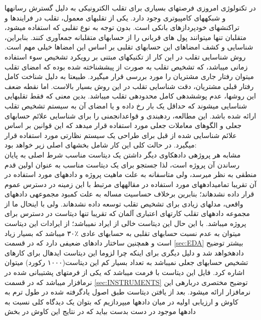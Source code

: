 \documentclass[journal]{IEEEtran}
\newcommand{\نیمفاصله}{\halfspace}
\renewcommand{\ }{\halfspace}
\newcommand{\وکا}{\lr{WEKA} }
\newcommand{\ار}{\lr{R} }
\renewcommand{\|}[1][.3em]{\hspace{#1}|\hspace{#1}}
\renewcommand{\,}[1][.3em]{,\hspace{#1}}
\begin{document}
در تکنولوژی امروزی فرصت\ های بسیاری برای تقلب الکترونیکی به دلیل گسترش رسانه\ ها و شبکه\ های کامپیوتری وجود دارد. یکی از تقلب\ های معمول، تقلب در فرایند\ ها و تراکنش\ های خودپردازهای بانکی است. بدون توجه به نوع تقلبی که استفاده می\ شود، متقلبان تنها می\ توانند پول های قربانی را از حساب\ های متقلبانه جمع\ آوری کنند. بنابراین، شناسایی و کشف امضاهای این حساب\ های تقلبی بر اساس این
امضاها خیلی مهم است.
روش شناسایی تقلب در این کار از تکنیک\ های مبتنی بر رویکرد تشخیص سوء استفاده زمانی می\ باشد، که تشخیص تقلب به صورت از پیش\ شناخته شده بوده که امضای تقلب می\ توان رفتار جاری مشتریان را مورد بررسی قرار می\ گیرد. طبیعتا به دلیل شناخت کامل رفتار قبلی مشتریان، دقت شناسایی تقلب در این روش بسیار بالاست. اما نقطه ضعف این روش\ ها، عدم پوشش\ دهی کامل محدوده\ ی تقلب می\ باشد. بدین معنی که فقط تقلب\ هایی شناسایی می\ شوند که حداقل یک بار رخ داده و یا امضای آن به سیستم تشخیص تقلب ارائه شده باشد.
این مطالعه، رده\ بندی و قواعد\ انجمنی را برای شناسایی علائم حساب\ های جعلی و الگوهای معاملات جعلی مورد استفاده قرار می\ دهد که این قوانین بر اساس علائم شناسایی شده از قبل برای طراحی یک سیستم نظارتی مورد استفاده قرار می\ گیرد. در حالت کلی این کار شامل بخش\ های اصلی زیر خواهد بود:\\
مشابه هر پروژه\ ی داده\ کاوی دیگر داشتن یک دیتاست مناسب شرط اصلی به پایان رساندن آن پروژه است، لذا جستجو برای یک دیتاست مناسب به عنوان اولین قدم منطقی به نظر می\ رسد، ولی متاسفانه به علت ماهیت پروژه و داده\ های مورد استفاده در آن تقریبا تمامی\ داده\ های مورد استفاده در مقاله\ های مرتبط با این زمینه در دسترس عموم قرار داده نشده\ اند؛ بنابرین برخلاف حساسیت مساله به علت کمبود مجموعه\ ی داده\ های واقعی، مدل\ های زیادی برای تشخیص تقلب توسعه داده نشده\ اند. ولی با این\ حال ما از مجموعه داده\ های تقلب کارت\ های اعتباری آلمان\
\cite{DATASET:GERMAN}
که تقریبا تنها دیتاست در دسترس برای پروژه می\ باشد. با این حال این دیتاست خالی از ایراد نمی\ باشد؛ از ایرادات این دیتاست می\ توان به عدم نسبت حساب\ های تقلبی به حساب\ های عادی ٪۳۰ می\ باشد که بسیار زیاد است و همچنین ساختار داده\ ای ضعیفی دارد که در قسمت
\ref{sec:EDA}
بیشتر توضیح داده\ خواهد شد و دلیل دیگری برای اینکه چرا لزوما این دیتاست ایده\ ال برای کارهای تشخیص حساب\ های جعلی نمی\ باشد به تعداد بسیار کم این دیتاست(۱۰۰۰ رکورد) می\ توان اشاره کرد. فایل این دیتاست با فرمت  می\ باشد که یکی از فرمت\ های پشتیبانی شده در نرم\ افزار \وکا می\ باشد که در قسمت
\ref{sec:INSTRUMENTS}
توضیح مختصری درباره\ ی این نرم\ افزار ارائه می\ شود.
بعد از یافتن دیتاست طبق اصول یادگرفته شده در طول ترم به کاوش و ارزیابی اولیه در میان داده\ ها می\ پردازیم که بتوان یک دیدگاه کلی نسبت به داده\ ها موجود در دست بدست بیاید که در نتایج این کاوش در بخش
\end{document}
